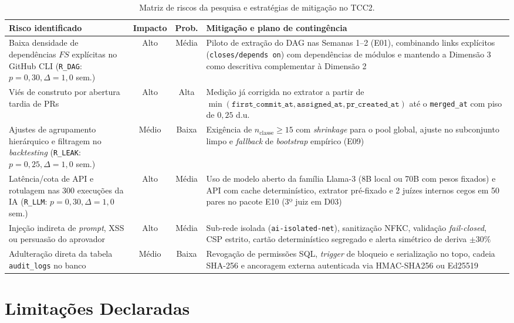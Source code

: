 \documentclass[12pt,openany,oneside,a4paper,english,brazilian,sumario=tradicional]{abntex2}
\newcommand{\fonteautores}{\par\vspace{1mm}{\small Fonte: Elaborado pelos autores (2026).}}
\begin{document}
\begin{table}[htbp]
\caption{Matriz de riscos da pesquisa e estratégias de mitigação no TCC2.}\label{tab:riscos}
{\scriptsize
\setlength{\tabcolsep}{3.5pt}
\begin{tabularx}{\textwidth}{L{3.9cm} c c Y}
\toprule
\textbf{Risco identificado} & \textbf{Impacto} & \textbf{Prob.} & \textbf{Mitigação e plano de contingência}\\
\midrule
Baixa densidade de dependências $FS$ explícitas no GitHub CLI (\texttt{R\_DAG}: $p=0{,}30, \Delta=1{,}0$ sem.) & Alto & Média & Piloto de extração do DAG nas Semanas 1--2 (E01), combinando links explícitos (\texttt{closes/depends on}) com dependências de módulos e mantendo a Dimensão 3 como descritiva complementar à Dimensão 2\\
Viés de construto por abertura tardia de PRs & Alto & Alta & Medição já corrigida no extrator a partir de $\min(\texttt{first\_commit\_at}, \texttt{assigned\_at}, \texttt{pr\_created\_at})$ até o \texttt{merged\_at} com piso de $0{,}25$ d.u.\\
Ajustes de agrupamento hierárquico e filtragem no \textit{backtesting} (\texttt{R\_LEAK}: $p=0{,}25, \Delta=1{,}0$ sem.) & Médio & Baixa & Exigência de $n_{\text{classe}}\ge 15$ com \textit{shrinkage} para o pool global, ajuste no subconjunto limpo e \textit{fallback} de \textit{bootstrap} empírico (E09)\\
Latência/cota de API e rotulagem nas 300 execuções da IA (\texttt{R\_LLM}: $p=0{,}30, \Delta=1{,}0$ sem.) & Alto & Média & Uso de modelo aberto da família Llama-3 (8B local ou 70B com pesos fixados) e API com cache determinístico, extrator pré-fixado e 2 juízes internos cegos em 50 pares no pacote E10 (3º juiz em D03)\\
Injeção indireta de \textit{prompt}, XSS ou persuasão do aprovador & Alto & Média & Sub-rede isolada (\texttt{ai-isolated-net}), sanitização NFKC, validação \textit{fail-closed}, CSP estrito, cartão determinístico segregado e alerta simétrico de deriva $\pm 30\%$\\
Adulteração direta da tabela \texttt{audit\_logs} no banco & Médio & Baixa & Revogação de permissões SQL, \textit{trigger} de bloqueio e serialização no topo, cadeia SHA-256 e ancoragem externa autenticada via HMAC-SHA256 ou Ed25519\\
\bottomrule
\end{tabularx}}
\fonteautores
\end{table}

\section{Limitações Declaradas}\label{sec:limitacoes}
\end{document}
